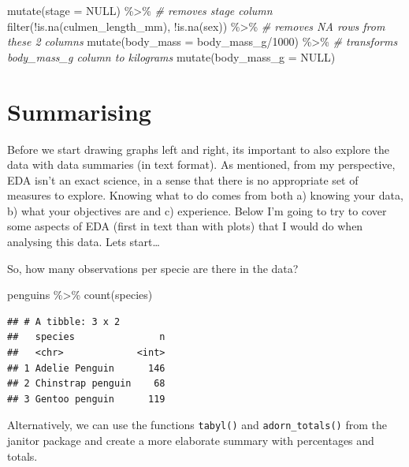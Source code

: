 \documentclass[
]{book}
\newenvironment{Shaded}{\begin{snugshade}}{\end{snugshade}}
\newcommand{\AttributeTok}[1]{\textcolor[rgb]{0.77,0.63,0.00}{#1}}
\newcommand{\CommentTok}[1]{\textcolor[rgb]{0.56,0.35,0.01}{\textit{#1}}}
\newcommand{\ConstantTok}[1]{\textcolor[rgb]{0.00,0.00,0.00}{#1}}
\newcommand{\DecValTok}[1]{\textcolor[rgb]{0.00,0.00,0.81}{#1}}
\newcommand{\FunctionTok}[1]{\textcolor[rgb]{0.00,0.00,0.00}{#1}}
\newcommand{\NormalTok}[1]{#1}
\newcommand{\SpecialCharTok}[1]{\textcolor[rgb]{0.00,0.00,0.00}{#1}}
\begin{document}
\begin{Shaded}
\begin{Highlighting}[]
  \FunctionTok{mutate}\NormalTok{(}\AttributeTok{stage =} \ConstantTok{NULL}\NormalTok{) }\SpecialCharTok{\%\textgreater{}\%}  \CommentTok{\# removes stage column}
  \FunctionTok{filter}\NormalTok{(}\SpecialCharTok{!}\FunctionTok{is.na}\NormalTok{(culmen\_length\_mm), }\SpecialCharTok{!}\FunctionTok{is.na}\NormalTok{(sex)) }\SpecialCharTok{\%\textgreater{}\%}   \CommentTok{\# removes NA rows from these 2 columns}
  \FunctionTok{mutate}\NormalTok{(}\AttributeTok{body\_mass =}\NormalTok{ body\_mass\_g}\SpecialCharTok{/}\DecValTok{1000}\NormalTok{) }\SpecialCharTok{\%\textgreater{}\%}   \CommentTok{\# transforms body\_mass\_g column to kilograms}
  \FunctionTok{mutate}\NormalTok{(}\AttributeTok{body\_mass\_g =} \ConstantTok{NULL}\NormalTok{)}
\end{Highlighting}
\end{Shaded}

\hypertarget{summarising}{%
\section{Summarising}\label{summarising}}

Before we start drawing graphs left and right, its important to also explore the data with data summaries (in text format).
As mentioned, from my perspective, EDA isn't an exact science, in a sense that there is no appropriate set of measures to explore.
Knowing what to do comes from both a) knowing your data, b) what your objectives are and c) experience.
Below I'm going to try to cover some aspects of EDA (first in text than with plots) that I would do when analysing this data.
Lets start\ldots{}

So, how many observations per specie are there in the data?

\begin{Shaded}
\begin{Highlighting}[]
\NormalTok{penguins }\SpecialCharTok{\%\textgreater{}\%} 
  \FunctionTok{count}\NormalTok{(species)}
\end{Highlighting}
\end{Shaded}

\begin{verbatim}
## # A tibble: 3 x 2
##   species               n
##   <chr>             <int>
## 1 Adelie Penguin      146
## 2 Chinstrap penguin    68
## 3 Gentoo penguin      119
\end{verbatim}

Alternatively, we can use the functions \texttt{tabyl()} and \texttt{adorn\_totals()} from the janitor package and create a more elaborate summary with percentages and totals.
\end{document}
